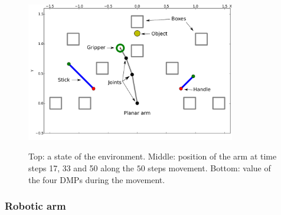 \documentclass[10pt,letterpaper]{article}
\begin{document}
		\begin{figure}[h]
			\centering
			\hspace{-0.73cm}
			\vspace{-0.59cm}
			\includegraphics[width=9.12cm]{./include/tools.pdf}
			\\
			\hspace{-0.42cm}
			\caption{Top: a state of the environment. Middle: position of the arm at time steps 17, 33 and 50 along the $50$ steps movement. Bottom: value of the four DMPs during the movement.}
			\label{env}
		\end{figure}

		\subsubsection{Robotic arm}
		
\end{document}
